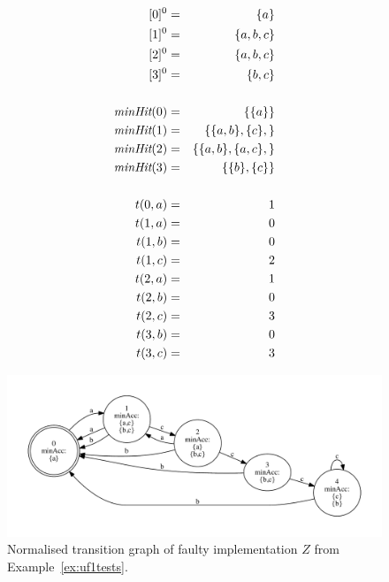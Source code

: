 \begin{eqnarray*}
{ }[0]^0 & = & \{ a \} \\
{ }[1]^0 & = & \{ a,b,c \} \\
{ }[2]^0 & = & \{ a,b,c \} \\
{ }[3]^0 & = & \{ b,c \} \\
& & \\
\text{\it minHit}(0) & = & \{ \{ a\} \} \\
\text{\it minHit}(1) & = & \{ \{a,b\}, \{c\}, \} \\
\text{\it minHit}(2) & = & \{  \{a,b\},  \{a,c\},\} \\
\text{\it minHit}(3) & = & \{ \{ b\}, \{c\} \} \\
& & \\
t(0,a) & = & 1 \\
t(1,a) & = & 0 \\
t(1,b) & = & 0 \\
t(1,c) & = & 2 \\
t(2,a) & = & 1 \\
t(2,b) & = & 0 \\
t(2,c) & = & 3 \\
t(3,b) & = & 0 \\
t(3,c) &  =& 3
\end{eqnarray*}



 \begin{figure}
 \begin{center}
\includegraphics[width=\textwidth]{z.pdf}
\end{center}
\caption{Normalised transition graph of faulty implementation $Z$  from Example~\ref{ex:uf1tests}.}
 \label{fig:tgZ}
 \end{figure}

